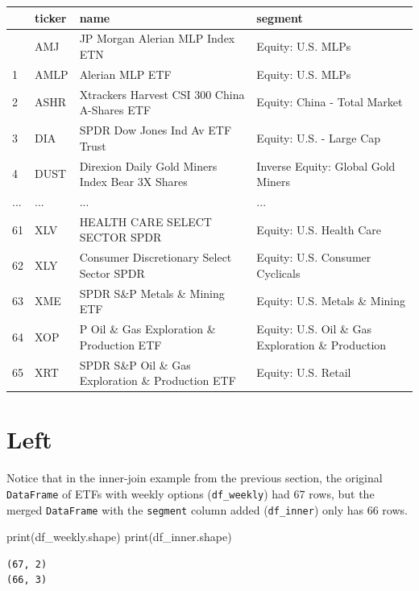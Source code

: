 \documentclass[
  letterpaper,
  DIV=11,
  numbers=noendperiod]{scrreprt}
\newenvironment{Shaded}{\begin{snugshade}}{\end{snugshade}}
\newcommand{\BuiltInTok}[1]{\textcolor[rgb]{0.00,0.23,0.31}{#1}}
\newcommand{\NormalTok}[1]{\textcolor[rgb]{0.00,0.23,0.31}{#1}}
\begin{document}
\begin{longtable}[]{@{}llll@{}}
\toprule\noalign{}
& ticker & name & segment \\
\midrule\noalign{}
\endhead
\bottomrule\noalign{}
\endlastfoot
0 & AMJ & JP Morgan Alerian MLP Index ETN & Equity: U.S. MLPs \\
1 & AMLP & Alerian MLP ETF & Equity: U.S. MLPs \\
2 & ASHR & Xtrackers Harvest CSI 300 China A-Shares ETF & Equity: China
- Total Market \\
3 & DIA & SPDR Dow Jones Ind Av ETF Trust & Equity: U.S. - Large Cap \\
4 & DUST & Direxion Daily Gold Miners Index Bear 3X Shares & Inverse
Equity: Global Gold Miners \\
... & ... & ... & ... \\
61 & XLV & HEALTH CARE SELECT SECTOR SPDR & Equity: U.S. Health Care \\
62 & XLY & Consumer Discretionary Select Sector SPDR & Equity: U.S.
Consumer Cyclicals \\
63 & XME & SPDR S\&P Metals \& Mining ETF & Equity: U.S. Metals \&
Mining \\
64 & XOP & P Oil \& Gas Exploration \& Production ETF & Equity: U.S. Oil
\& Gas Exploration \& Production \\
65 & XRT & SPDR S\&P Oil \& Gas Exploration \& Production ETF & Equity:
U.S. Retail \\
\end{longtable}

\hypertarget{left}{%
\section{Left}\label{left}}

Notice that in the inner-join example from the previous section, the
original \texttt{DataFrame} of ETFs with weekly options
(\texttt{df\_weekly}) had 67 rows, but the merged \texttt{DataFrame}
with the \texttt{segment} column added (\texttt{df\_inner}) only has 66
rows.

\begin{Shaded}
\begin{Highlighting}[]
\BuiltInTok{print}\NormalTok{(df\_weekly.shape)}
\BuiltInTok{print}\NormalTok{(df\_inner.shape)}
\end{Highlighting}
\end{Shaded}

\begin{verbatim}
(67, 2)
(66, 3)
\end{verbatim}
\end{document}

